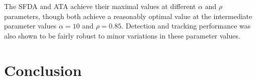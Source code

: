 \documentclass[twocolumn, final]{svjour3}
\begin{document}
The SFDA and ATA achieve their maximal values at different $\alpha$ and $\rho$ parameters, though both achieve a reasonably optimal value at the intermediate parameter values $\alpha = 10$ and $\rho = 0.85$. Detection and tracking performance was also shown to be fairly robust to minor variations in these parameter values.





\section{Conclusion}
\label{sec:conclusion}
\end{document}
